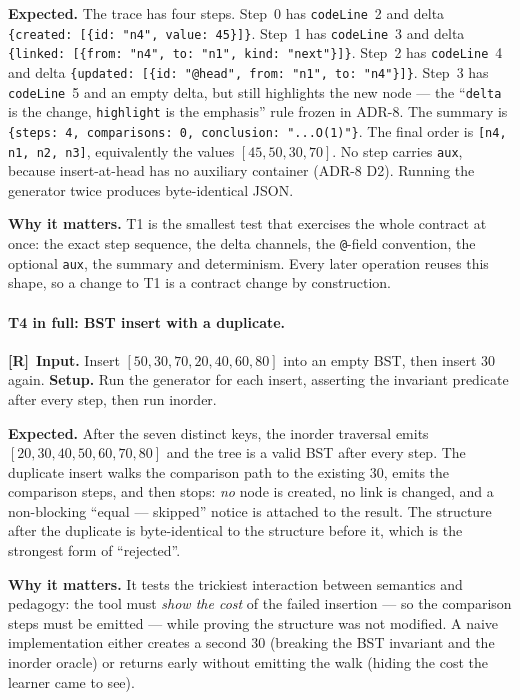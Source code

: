 \documentclass[11pt,a4paper]{article}
\newcommand{\R}{\textcolor{reqc}{\textbf{[R]}}}     %
\newcommand{\ct}[1]{\texttt{#1}}
\begin{document}
\smallskip
\noindent\textbf{Expected.} The trace has four steps. Step~0 has \ct{codeLine}~2 and delta
\ct{\{created: [\{id: "n4", value: 45\}]\}}. Step~1 has \ct{codeLine}~3 and delta
\ct{\{linked: [\{from: "n4", to: "n1", kind: "next"\}]\}}. Step~2 has \ct{codeLine}~4 and
delta \ct{\{updated: [\{id: "@head", from: "n1", to: "n4"\}]\}}. Step~3 has \ct{codeLine}~5
and an empty delta, but still highlights the new node --- the ``\ct{delta} is the change,
\ct{highlight} is the emphasis'' rule frozen in ADR-8. The summary is
\ct{\{steps: 4, comparisons: 0, conclusion: "...O(1)"\}}. The final order is
\ct{[n4, n1, n2, n3]}, equivalently the values $[45, 50, 30, 70]$. No step carries
\ct{aux}, because insert-at-head has no auxiliary container (ADR-8 D2). Running the
generator twice produces byte-identical JSON.

\smallskip
\noindent\textbf{Why it matters.} T1 is the smallest test that exercises the whole contract
at once: the exact step sequence, the delta channels, the \ct{@}-field convention, the
optional \ct{aux}, the summary and determinism. Every later operation reuses this shape, so a
change to T1 is a contract change by construction.

\paragraph{T4 in full: BST insert with a duplicate.}
\R\ \textbf{Input.} Insert $[50, 30, 70, 20, 40, 60, 80]$ into an empty BST, then insert
$30$ again. \textbf{Setup.} Run the generator for each insert, asserting the invariant
predicate after every step, then run inorder.

\smallskip
\noindent\textbf{Expected.} After the seven distinct keys, the inorder traversal emits
$[20, 30, 40, 50, 60, 70, 80]$ and the tree is a valid BST after every step. The duplicate
insert walks the comparison path to the existing $30$, emits the comparison steps, and then
stops: \emph{no} node is created, no link is changed, and a non-blocking ``equal --- skipped''
notice is attached to the result. The structure after the duplicate is byte-identical to the
structure before it, which is the strongest form of ``rejected''.

\smallskip
\noindent\textbf{Why it matters.} It tests the trickiest interaction between semantics and
pedagogy: the tool must \emph{show the cost} of the failed insertion --- so the comparison
steps must be emitted --- while proving the structure was not modified. A naive
implementation either creates a second $30$ (breaking the BST invariant and the inorder
oracle) or returns early without emitting the walk (hiding the cost the learner came to
see).
\end{document}
